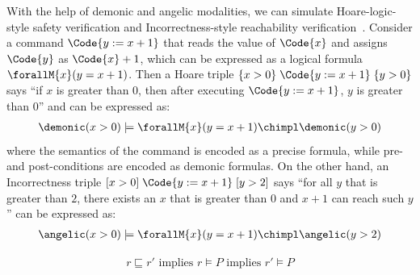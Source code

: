 \begin{example} With the help of demonic and angelic modalities, we can simulate Hoare-logic-style safety verification and Incorrectness-style reachability verification~\cite{OHP19}. Consider a command $\Code{y := x + 1}$ that reads the value of $\Code{x}$ and assigns $\Code{y}$ as $\Code{x} + 1$, which can be expressed as a logical formula $\forallM{x} (y = x + 1)$. Then a Hoare triple $\{x > 0\}\;\Code{y := x + 1}\;\{y > 0\}$ says ``if $x$ is greater than $0$, then after executing $\Code{y := x + 1}$, $y$ is greater than $0$'' and can be expressed as:
  \begin{align*}
    \demonic (x > 0) \models \forallM{x} (y = x + 1) \chimpl \demonic (y > 0)
  \end{align*}\noindent
where the semantics of the command is encoded as a precise formula, while pre- and post-conditions are encoded as demonic formulas.
On the other hand, an Incorrectness triple $[x > 0]\;\Code{y := x + 1}\;[y > 2]$ says ``for all $y$ that is greater than $2$, there exists an $x$ that is greater than $0$ and $x + 1$ can reach such $y$'' can be expressed as:
  \begin{align*}
    \angelic (x > 0) \models \forallM{x} (y = x + 1) \chimpl \angelic (y > 2)
  \end{align*}\noindent
\end{example}

\begin{theorem} 
  \begin{align*}
    r \sqsubseteq r' \text{ implies } r \models P \text{ implies } r' \models P
  \end{align*}\noindent
\end{theorem}